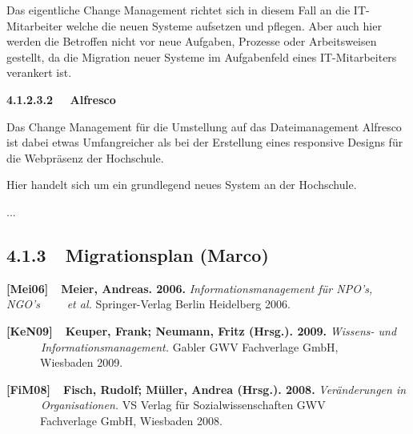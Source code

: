 \documentclass[a4paper]{article}
\begin{document}
\bigskip

{\sffamily
Das eigentliche Change Management richtet sich in diesem Fall an die IT-Mitarbeiter welche die neuen Systeme aufsetzen
und pflegen. Aber auch hier werden die Betroffen nicht vor neue Aufgaben, Prozesse oder Arbeitsweisen gestellt, da die
Migration neuer Systeme im Aufgabenfeld eines IT-Mitarbeiters verankert ist. }


\bigskip

{\sffamily\bfseries
4.1.2.3.2 \ \ Alfresco}

{\sffamily
Das Change Management für die Umstellung auf das Dateimanagement Alfresco ist dabei etwas Umfangreicher als bei der
Erstellung eines responsive Designs für die Webpräsenz der Hochschule. }


\bigskip

{\sffamily
Hier handelt sich um ein grundlegend neues System an der Hochschule. }

{\sffamily
...}

\subsection[]{\bfseries }
\clearpage\subsection[4.1.3\ \ Migrationsplan (Marco)]{\bfseries 4.1.3\ \ Migrationsplan \textmd{(Marco)}}

\bigskip



\bigskip

{\sffamily\color[rgb]{0.8,0.8,0.8}
\textbf{[Mei06]\ \ Meier, Andreas. 2006.} \textit{Informationsmanagement f\"{u}r NPO’s, NGO’s \ \ \ \ et al.
}Springer-Verlag Berlin Heidelberg 2006.}

{}

{\sffamily\color[rgb]{0.8,0.8,0.8}
\textbf{[KeN09]\ \ Keuper, Frank; Neumann, Fritz (Hrsg.). 2009. }\textit{Wissens- und
\ \ \ \ \ \ Informationsmanagement. }Gabler {\textbar} GWV Fachverlage GmbH, \ \ \ \ \ \ Wiesbaden 2009.}

{\sffamily
\textbf{\textcolor[rgb]{0.12941177,0.11764706,0.11764706}{[FiM08]\ \ Fisch, Rudolf; Müller, Andrea (Hrsg.).
2008.}}\textcolor[rgb]{0.12941177,0.11764706,0.11764706}{
}\textit{\textcolor[rgb]{0.12941177,0.11764706,0.11764706}{Veränderungen in
\ \ \ \ \ \ Organisationen.}}\textcolor[rgb]{0.12941177,0.11764706,0.11764706}{ VS Verlag f\"{u}r Sozialwissenschaften
{\textbar} GWV \ \ \ \ \ \ Fachverlage GmbH, Wiesbaden 2008.}}
\end{document}
